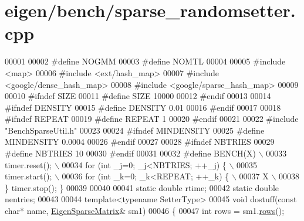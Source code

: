 \hypertarget{eigen_2bench_2sparse__randomsetter_8cpp_source}{}\section{eigen/bench/sparse\+\_\+randomsetter.cpp}
\label{eigen_2bench_2sparse__randomsetter_8cpp_source}

\begin{DoxyCode}
00001 
00002 \textcolor{preprocessor}{#define NOGMM}
00003 \textcolor{preprocessor}{#define NOMTL}
00004 
00005 \textcolor{preprocessor}{#include <map>}
00006 \textcolor{preprocessor}{#include <ext/hash\_map>}
00007 \textcolor{preprocessor}{#include <google/dense\_hash\_map>}
00008 \textcolor{preprocessor}{#include <google/sparse\_hash\_map>}
00009 
00010 \textcolor{preprocessor}{#ifndef SIZE}
00011 \textcolor{preprocessor}{#define SIZE 10000}
00012 \textcolor{preprocessor}{#endif}
00013 
00014 \textcolor{preprocessor}{#ifndef DENSITY}
00015 \textcolor{preprocessor}{#define DENSITY 0.01}
00016 \textcolor{preprocessor}{#endif}
00017 
00018 \textcolor{preprocessor}{#ifndef REPEAT}
00019 \textcolor{preprocessor}{#define REPEAT 1}
00020 \textcolor{preprocessor}{#endif}
00021 
00022 \textcolor{preprocessor}{#include "BenchSparseUtil.h"}
00023 
00024 \textcolor{preprocessor}{#ifndef MINDENSITY}
00025 \textcolor{preprocessor}{#define MINDENSITY 0.0004}
00026 \textcolor{preprocessor}{#endif}
00027 
00028 \textcolor{preprocessor}{#ifndef NBTRIES}
00029 \textcolor{preprocessor}{#define NBTRIES 10}
00030 \textcolor{preprocessor}{#endif}
00031 
00032 \textcolor{preprocessor}{#define BENCH(X) \(\backslash\)}
00033 \textcolor{preprocessor}{  timer.reset(); \(\backslash\)}
00034 \textcolor{preprocessor}{  for (int \_j=0; \_j<NBTRIES; ++\_j) \{ \(\backslash\)}
00035 \textcolor{preprocessor}{    timer.start(); \(\backslash\)}
00036 \textcolor{preprocessor}{    for (int \_k=0; \_k<REPEAT; ++\_k) \{ \(\backslash\)}
00037 \textcolor{preprocessor}{        X  \(\backslash\)}
00038 \textcolor{preprocessor}{  \} timer.stop(); \}}
00039 
00040 
00041 \textcolor{keyword}{static} \textcolor{keywordtype}{double} rtime;
00042 \textcolor{keyword}{static} \textcolor{keywordtype}{double} nentries;
00043 
00044 \textcolor{keyword}{template}<\textcolor{keyword}{typename} SetterType>
00045 \textcolor{keywordtype}{void} dostuff(\textcolor{keyword}{const} \textcolor{keywordtype}{char}* name, \hyperlink{group___sparse_core___module}{EigenSparseMatrix}& sm1)
00046 \{
00047   \textcolor{keywordtype}{int} rows = sm1.\hyperlink{group___sparse_core___module_a62e61bb861eee306d5b069ce652b5aa5}{rows}();

\end{DoxyCode}
